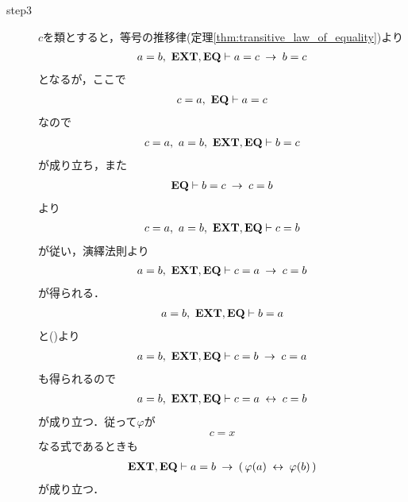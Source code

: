 \begin{sketch}
\begin{description}
			\item[step3]
				$c$を類とすると，等号の推移律(定理\ref{thm:transitive_law_of_equality})より
				\begin{align}
					a = b,\ \mbox{{\bf EXT}},\mbox{{\bf EQ}} \vdash a = c \hspace{0.25em}\rightarrow\hspace{0.25em} b = c
				\end{align}
				となるが，ここで
				\begin{align}
					c = a,\ \mbox{{\bf EQ}} \vdash a = c
				\end{align}
				なので
				\begin{align}
					c = a,\ a = b,\ \mbox{{\bf EXT}},\mbox{{\bf EQ}} \vdash b = c
				\end{align}
				が成り立ち，また
				\begin{align}
					\mbox{{\bf EQ}} \vdash b = c \hspace{0.25em}\rightarrow\hspace{0.25em} c = b
				\end{align}
				より
				\begin{align}
					c = a,\ a = b,\ \mbox{{\bf EXT}},\mbox{{\bf EQ}} \vdash c = b
				\end{align}
				が従い，演繹法則より
				\begin{align}
					a = b,\ \mbox{{\bf EXT}},\mbox{{\bf EQ}} \vdash c = a \hspace{0.25em}\rightarrow\hspace{0.25em} c = b
					\label{fom:the_principle_of_substitution_1}
				\end{align}
				が得られる．
				\begin{align}
					a = b,\ \mbox{{\bf EXT}},\mbox{{\bf EQ}} \vdash b = a
				\end{align}
				と()より
				\begin{align}
					a = b,\ \mbox{{\bf EXT}},\mbox{{\bf EQ}} \vdash c = b \hspace{0.25em}\rightarrow\hspace{0.25em} c = a
				\end{align}
				も得られるので
				\begin{align}
					a = b,\ \mbox{{\bf EXT}},\mbox{{\bf EQ}} \vdash c = a \hspace{0.25em}\leftrightarrow\hspace{0.25em} c = b
				\end{align}
				が成り立つ．従って$\varphi$が
				\begin{align}
					c = x
				\end{align}
				なる式であるときも
				\begin{align}
					\mbox{{\bf EXT}},\mbox{{\bf EQ}} \vdash a = b \hspace{0.25em}\rightarrow\hspace{0.25em} (\, \varphi(a) \hspace{0.25em}\leftrightarrow\hspace{0.25em} \varphi(b)\, )
				\end{align}
				が成り立つ．
			

\end{description}
\end{sketch}
